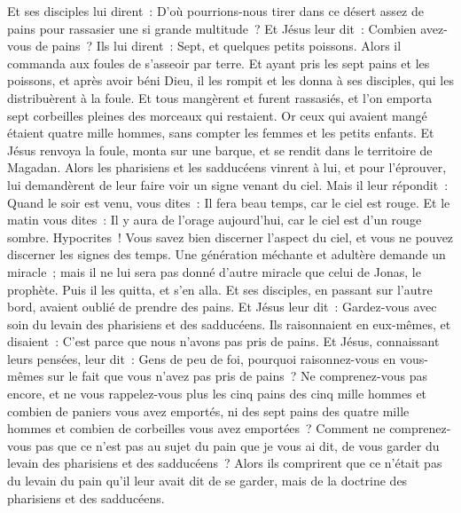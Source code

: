 \begin{multicols}{2}
Et ses disciples lui dirent~: D'où pourrions-nous tirer dans ce désert assez de pains pour rassasier une si grande multitude~?
Et Jésus leur dit~: Combien avez-vous de pains~? Ils lui dirent~: Sept, et quelques petits poissons.
Alors il commanda aux foules de s'asseoir par terre.
Et ayant pris les sept pains et les poissons, et après avoir béni Dieu, il les rompit et les donna à ses disciples, qui les distribuèrent à la foule.
Et tous mangèrent et furent rassasiés, et l'on emporta sept corbeilles pleines des morceaux qui restaient.
Or ceux qui avaient mangé étaient quatre mille hommes, sans compter les femmes et les petits enfants.
Et Jésus renvoya la foule, monta sur une barque, et se rendit dans le territoire de Magadan.
\VerseOne{}Alors les pharisiens et les sadducéens vinrent à lui, et pour l'éprouver, lui demandèrent de leur faire voir un signe venant du ciel.
Mais il leur répondit~: Quand le soir est venu, vous dites~: Il fera beau temps, car le ciel est rouge.
Et le matin vous dites~: Il y aura de l'orage aujourd'hui, car le ciel est d'un rouge sombre. Hypocrites~! Vous savez bien discerner l'aspect du ciel, et vous ne pouvez discerner les signes des temps.
Une génération méchante et adultère demande un miracle~; mais il ne lui sera pas donné d'autre miracle que celui de Jonas, le prophète. Puis il les quitta, et s'en alla.
Et ses disciples, en passant sur l'autre bord, avaient oublié de prendre des pains.
Et Jésus leur dit~: Gardez-vous avec soin du levain des pharisiens et des sadducéens.
Ils raisonnaient en eux-mêmes, et disaient~: C'est parce que nous n'avons pas pris de pains.
Et Jésus, connaissant leurs pensées, leur dit~: Gens de peu de foi, pourquoi raisonnez-vous en vous-mêmes sur le fait que vous n'avez pas pris de pains~?
Ne comprenez-vous pas encore, et ne vous rappelez-vous plus les cinq pains des cinq mille hommes et combien de paniers vous avez emportés,
ni des sept pains des quatre mille hommes et combien de corbeilles vous avez emportées~?
Comment ne comprenez-vous pas que ce n'est pas au sujet du pain que je vous ai dit, de vous garder du levain des pharisiens et des sadducéens~?
Alors ils comprirent que ce n'était pas du levain du pain qu'il leur avait dit de se garder, mais de la doctrine des pharisiens et des sadducéens.

\end{multicols}
